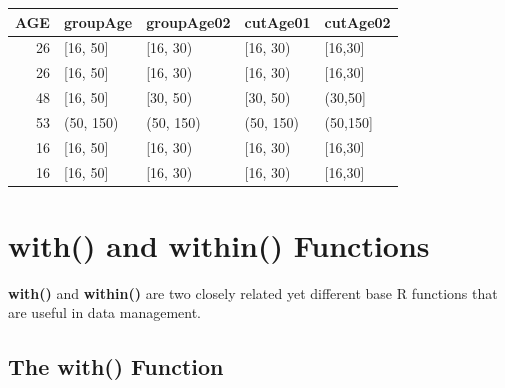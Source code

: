 \documentclass[
]{book}
\newenvironment{Shaded}{\begin{snugshade}}{\end{snugshade}}
\newcommand{\AttributeTok}[1]{\textcolor[rgb]{0.13,0.29,0.53}{#1}}
\newcommand{\ConstantTok}[1]{\textcolor[rgb]{0.56,0.35,0.01}{#1}}
\newcommand{\DecValTok}[1]{\textcolor[rgb]{0.00,0.00,0.81}{#1}}
\newcommand{\FunctionTok}[1]{\textcolor[rgb]{0.13,0.29,0.53}{\textbf{#1}}}
\newcommand{\NormalTok}[1]{#1}
\newcommand{\OtherTok}[1]{\textcolor[rgb]{0.56,0.35,0.01}{#1}}
\newcommand{\SpecialCharTok}[1]{\textcolor[rgb]{0.81,0.36,0.00}{\textbf{#1}}}
\newcommand{\StringTok}[1]{\textcolor[rgb]{0.31,0.60,0.02}{#1}}
\begin{document}
\begin{Shaded}
\end{Shaded}

\begin{tabular}{r|l|l|l|l}
\hline
AGE & groupAge & groupAge02 & cutAge01 & cutAge02\\
\hline
26 & [16, 50] & [16, 30) & [16, 30) & [16,30]\\
\hline
26 & [16, 50] & [16, 30) & [16, 30) & [16,30]\\
\hline
48 & [16, 50] & [30, 50) & [30, 50) & (30,50]\\
\hline
53 & (50, 150) & (50, 150) & (50, 150) & (50,150]\\
\hline
16 & [16, 50] & [16, 30) & [16, 30) & [16,30]\\
\hline
16 & [16, 50] & [16, 30) & [16, 30) & [16,30]\\
\hline
\end{tabular}

\hypertarget{with-and-within-functions}{%
\section{\texorpdfstring{\textbf{with()} and \textbf{within()} Functions}{with() and within() Functions}}\label{with-and-within-functions}}

\textbf{with()} and \textbf{within()} are two closely related yet different base R functions that are useful in data management.

\hypertarget{the-with-function}{%
\subsection{\texorpdfstring{The \textbf{with()} Function}{The with() Function}}\label{the-with-function}}
\end{document}
